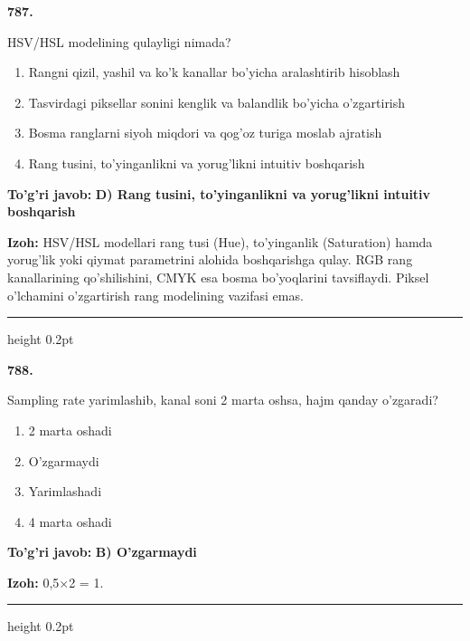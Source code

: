 \documentclass[10pt,a4paper,oneside]{article}
\begin{document}
\noindent\textbf{\color{ink}787.}
\par
HSV/HSL modelining qulayligi nimada?
\begin{enumerate}[label=\Alph*),leftmargin=9mm]
\item Rangni qizil, yashil va ko'k kanallar bo'yicha aralashtirib hisoblash
\item Tasvirdagi piksellar sonini kenglik va balandlik bo'yicha o'zgartirish
\item Bosma ranglarni siyoh miqdori va qog'oz turiga moslab ajratish
\item Rang tusini, to'yinganlikni va yorug'likni intuitiv boshqarish
\end{enumerate}
\begin{tcolorbox}[enhanced,breakable,colback=teal!4,colframe=teal!50!black,boxrule=0.5pt,arc=1.1mm,left=3mm,right=3mm,top=1.7mm,bottom=1.7mm,before skip=2mm,after skip=2mm]
\textbf{\color{teal}To'g'ri javob:} \textbf{D) Rang tusini, to'yinganlikni va yorug'likni intuitiv boshqarish}
\par\smallskip
\textbf{Izoh:} HSV/HSL modellari rang tusi (Hue), to'yinganlik (Saturation) hamda yorug'lik yoki qiymat parametrini alohida boshqarishga qulay. RGB rang kanallarining qo'shilishini, CMYK esa bosma bo'yoqlarini tavsiflaydi. Piksel o'lchamini o'zgartirish rang modelining vazifasi emas.
\end{tcolorbox}
\vspace{2mm}\hrule height 0.2pt \vspace{3mm}

\noindent\textbf{\color{ink}788.}
\par
Sampling rate yarimlashib, kanal soni 2 marta oshsa, hajm qanday o'zgaradi?
\begin{enumerate}[label=\Alph*),leftmargin=9mm]
\item 2 marta oshadi
\item O'zgarmaydi
\item Yarimlashadi
\item 4 marta oshadi
\end{enumerate}
\begin{tcolorbox}[enhanced,breakable,colback=teal!4,colframe=teal!50!black,boxrule=0.5pt,arc=1.1mm,left=3mm,right=3mm,top=1.7mm,bottom=1.7mm,before skip=2mm,after skip=2mm]
\textbf{\color{teal}To'g'ri javob:} \textbf{B) O'zgarmaydi}
\par\smallskip
\textbf{Izoh:} 0,5\ensuremath{\times}2 = 1.
\end{tcolorbox}
\vspace{2mm}\hrule height 0.2pt \vspace{3mm}
\end{document}

